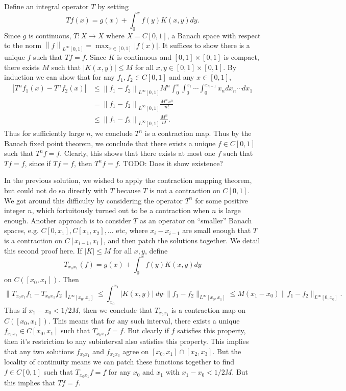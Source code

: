 \documentclass{exam}
\theoremstyle{problemstyle}
\newcommand{\norm}[1]{\left\lVert#1\right\rVert} %
\newcommand{\1}[1]{\textbf{1}_{\left[#1\right]}} %
\begin{document}
\begin{questions}
  \begin{solution}
    Define an integral operator $T$ by setting
    \[ Tf(x) = g(x)+\int_{0}^{x}f(y)K(x,y)dy. \]
    Since $g$ is continuous, $T:X\to X$ where $X=C[0,1]$, a Banach space with respect to the norm $\norm{f}_{L^\infty[0,1]} = \max_{x\in[0,1]} |f(x)|$. It suffices to show there is a unique $f$ such that $Tf = f$. Since $K$ is continuous and $[0,1]\times[0,1]$ is compact, there exists $M$ such that $|K(x,y)|\leq M$ for all $x,y\in [0,1]\times[0,1]$.
    By induction we can show that for any $f_{1},f_{2}\in C[0,1]$ and any $x\in [0,1]$,
    \begin{align*}
      |T^{n}f_{1}(x)-T^{n}f_{2}(x)|
      &\leq \norm{f_{1}-f_{2}}_{L^\infty[0,1]} M^{n}\int_{0}^{x}\int_{0}^{x_{1}}\cdots \int_{0}^{x_{n-1}}x_{n}dx_{n}\cdots dx_{1}\\
      &=\norm{f_{1}-f_{2}}_{L^\infty[0,1]} \frac{M^n x^{n}}{n! }\\
      &\leq \norm{f_{1}-f_{2}}_{L^\infty[0,1]} \frac{M^{n}}{n!}.
    \end{align*}
    Thus for sufficiently large $n$, we conclude $T^n$ is a contraction map. Thus by the Banach fixed point theorem, we conclude that there exists a unique $f \in C[0,1]$ such that $T^n f = f$. Clearly, this shows that there exists at most one $f$ such that $Tf = f$, since if $Tf = f$, then $T^n f = f$. TODO: Does it show existence?

    In the previous solution, we wished to apply the contraction mapping theorem, but could not do so directly with $T$ because $T$ is not a contraction on $C[0,1]$. We got around this difficulty by considering the operator $T^n$ for some positive integer $n$, which fortuitously turned out to be a contraction when $n$ is large enough. Another approach is to consider $T$ as an operator on ``smaller'' Banach spaces, e.g. $C[0,x_1], C[x_1,x_2], \ldots$ etc, where $x_i-x_{i-1}$ are small enough that $T$ is a contraction on $C[x_{i-1},x_{i}]$, and then patch the solutions together. We detail this second proof here. If $|K|\leq M$ for all $x,y$, define
    \[ T_{x_0 x_1}(f)= g(x)+\int_{0}^{x}f(y)K(x,y)dy \]
    on $C([x_0,x_1])$. Then
    \[ \| T_{x_0 x_1} f_1 - T_{x_0 x_1} f_2 \|_{L^\infty[x_0,x_1]} \leq \int_{x_0}^{x_1} |K(x,y)|\; dy \cdot \| f_1 - f_2 \|_{L^\infty[x_0,x_1]} \leq M(x_1 - x_0) \| f_1 - f_2 \|_{L^\infty[0,x_0]}. \]
    Thus if $x_1 - x_0 < 1/2M$, then we conclude that $T_{x_0 x_1}$ is a contraction map on $C([x_0,x_1])$. This means that for any such interval, there exists a unique $f_{x_0x_1} \in C[x_0,x_1]$ such that $T_{x_0 x_1} f = f$. But clearly if $f$ satisfies this property, then it's restriction to any subinterval also satisfies this property. This implies that any two solutions $f_{x_0x_1}$ and $f_{x_2x_3}$ agree on $[x_0,x_1] \cap [x_2,x_3]$. But the locality of continuity means we can patch these functions together to find $f \in C[0,1]$ such that $T_{x_0x_1} f = f$ for any $x_0$ and $x_1$ with $x_1 - x_0 < 1/2M$. But this implies that $Tf = f$.
\end{solution}


\end{questions}
\end{document}

